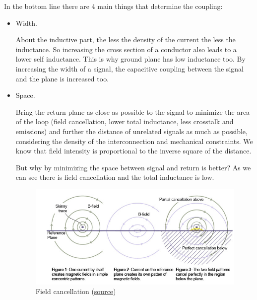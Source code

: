 \documentclass[final]{cubedoc}
\begin{document}
	
	
	In the bottom line there are 4 main things that determine the coupling:
	
	\begin{itemize}
		\item Width.
		
		
		About the inductive part, the less the density of the current the less the inductance. So increasing the cross section of a conductor also leads to a lower self inductance. This is why ground plane has low inductance too. By increasing the width of a signal, the capacitive coupling between the signal and the plane is increased too.
		\item Space.
		
		Bring the return plane as close as possible to the signal to minimize the area of the loop (field cancellation, lower total inductance, less crosstalk and emissions) and further the distance of unrelated signals as much as possible, considering the density of the interconnection and mechanical constraints. We know that field intensity is proportional to the inverse square of the distance.
		
		But why by minimizing the space between signal and return is better? As we can see there is field cancellation and the total inductance is low. 
		
		\begin{figure}[h!]
			\centering
			\includegraphics[keepaspectratio, width = \textwidth]{assets/field_cancellation.png}	
			\caption{Field cancellation \small{(\href{https://web.archive.org/web/20200814095523/http://www.signalintegrity.com/Pubs/edn/FieldCancellation.htm}{source})}}
		\end{figure}
		

\end{itemize}
\end{document}
